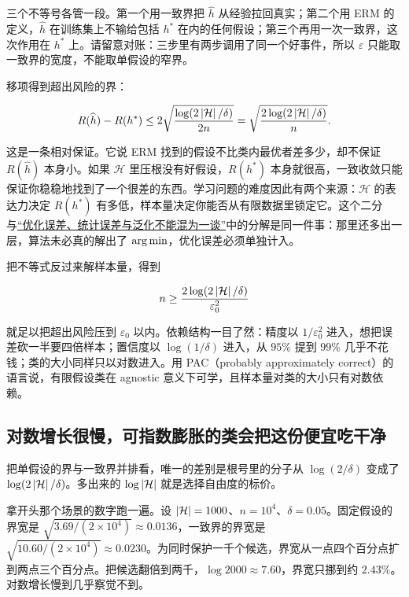 三个不等号各管一段。第一个用一致界把 \(\widehat h\) 从经验拉回真实；第二个用 ERM 的定义，\(\widehat h\) 在训练集上不输给包括 \(h^*\) 在内的任何假设；第三个再用一次一致界，这次作用在 \(h^*\) 上。请留意对账：三步里有两步调用了同一个好事件，所以 \(\varepsilon\) 只能取一致界的宽度，不能取单假设的窄界。

移项得到超出风险的界：

\[
R(\widehat h) - R(h^*)
\le 2\sqrt{\frac{\log(2\left|\mathcal{H}\right|/\delta)}{2n}}
= \sqrt{\frac{2\log(2\left|\mathcal{H}\right|/\delta)}{n}}.
\]

这是一条相对保证。它说 ERM 找到的假设不比类内最优者差多少，却不保证 \(R(\widehat h)\) 本身小。如果 \(\mathcal{H}\) 里压根没有好假设，\(R(h^*)\) 本身就很高，一致收敛只能保证你稳稳地找到了一个很差的东西。学习问题的难度因此有两个来源：\(\mathcal{H}\) 的表达力决定 \(R(h^*)\) 有多低，样本量决定你能否从有限数据里锁定它。这个二分与\hyperref[sec:09-Convex-Optimization/08-Nonconvex-and-Stochastic-Optimization/06]{``优化误差、统计误差与泛化不能混为一谈''}中的分解是同一件事：那里还多出一层，算法未必真的解出了 \(\operatorname*{arg\,min}\)，优化误差必须单独计入。

把不等式反过来解样本量，得到

\[
n \ge \frac{2\log(2\left|\mathcal{H}\right|/\delta)}{\varepsilon_0^2}
\]

就足以把超出风险压到 \(\varepsilon_0\) 以内。依赖结构一目了然：精度以 \(1/\varepsilon_0^2\) 进入，想把误差砍一半要四倍样本；置信度以 \(\log(1/\delta)\) 进入，从 \(95\%\) 提到 \(99\%\) 几乎不花钱；类的大小同样只以对数进入。用 PAC（probably approximately correct）的语言说，有限假设类在 agnostic 意义下可学，且样本量对类的大小只有对数依赖。

\subsection{对数增长很慢，可指数膨胀的类会把这份便宜吃干净}

把单假设的界与一致界并排看，唯一的差别是根号里的分子从 \(\log(2/\delta)\) 变成了 \(\log(2\left|\mathcal{H}\right|/\delta)\)。多出来的 \(\log\left|\mathcal{H}\right|\) 就是选择自由度的标价。

拿开头那个场景的数字跑一遍。设 \(\left|\mathcal{H}\right| = 1000\)、\(n = 10^4\)、\(\delta = 0.05\)。固定假设的界宽是 \(\sqrt{3.69/(2\times 10^4)} \approx 0.0136\)，一致界的界宽是 \(\sqrt{10.60/(2\times 10^4)} \approx 0.0230\)。为同时保护一千个候选，界宽从一点四个百分点扩到两点三个百分点。把候选翻倍到两千，\(\log 2000 \approx 7.60\)，界宽只挪到约 \(2.43\%\)。对数增长慢到几乎察觉不到。

